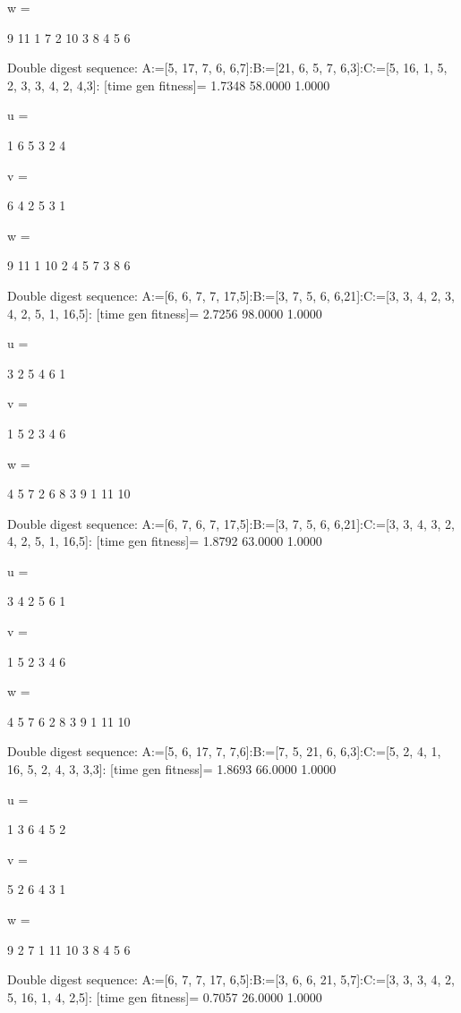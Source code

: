 w =

     9    11     1     7     2    10     3     8     4     5     6

Double digest sequence:
A:=[5, 17, 7, 6, 6,7]:B:=[21, 6, 5, 7, 6,3]:C:=[5, 16, 1, 5, 2, 3, 3, 4, 2, 4,3]:
[time gen fitness]=
    1.7348   58.0000    1.0000


u =

     1     6     5     3     2     4


v =

     6     4     2     5     3     1


w =

     9    11     1    10     2     4     5     7     3     8     6

Double digest sequence:
A:=[6, 6, 7, 7, 17,5]:B:=[3, 7, 5, 6, 6,21]:C:=[3, 3, 4, 2, 3, 4, 2, 5, 1, 16,5]:
[time gen fitness]=
    2.7256   98.0000    1.0000


u =

     3     2     5     4     6     1


v =

     1     5     2     3     4     6


w =

     4     5     7     2     6     8     3     9     1    11    10

Double digest sequence:
A:=[6, 7, 6, 7, 17,5]:B:=[3, 7, 5, 6, 6,21]:C:=[3, 3, 4, 3, 2, 4, 2, 5, 1, 16,5]:
[time gen fitness]=
    1.8792   63.0000    1.0000


u =

     3     4     2     5     6     1


v =

     1     5     2     3     4     6


w =

     4     5     7     6     2     8     3     9     1    11    10

Double digest sequence:
A:=[5, 6, 17, 7, 7,6]:B:=[7, 5, 21, 6, 6,3]:C:=[5, 2, 4, 1, 16, 5, 2, 4, 3, 3,3]:
[time gen fitness]=
    1.8693   66.0000    1.0000


u =

     1     3     6     4     5     2


v =

     5     2     6     4     3     1


w =

     9     2     7     1    11    10     3     8     4     5     6

Double digest sequence:
A:=[6, 7, 7, 17, 6,5]:B:=[3, 6, 6, 21, 5,7]:C:=[3, 3, 3, 4, 2, 5, 16, 1, 4, 2,5]:
[time gen fitness]=
    0.7057   26.0000    1.0000


